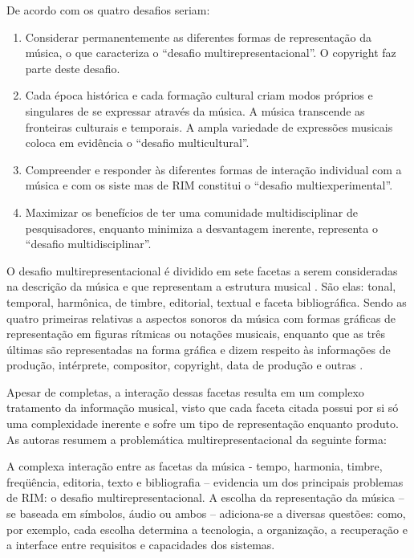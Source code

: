 De acordo com  os quatro desafios seriam:

\begin{citacao}
    \begin{enumerate}
        \item Considerar permanentemente as diferentes formas de representação da música, o que caracteriza o “desafio multirepresentacional”. O copyright faz parte deste desafio.
        \item Cada época histórica e cada formação cultural criam modos próprios e singulares de se expressar através da música. A música transcende as fronteiras culturais e temporais. A ampla variedade de expressões musicais coloca em evidência o “desafio multicultural”.
        \item Compreender e responder às diferentes formas de interação individual com a música e com os siste mas de RIM constitui o “desafio multiexperimental”.
        \item Maximizar os benefícios de ter uma comunidade multidisciplinar de pesquisadores, enquanto minimiza a desvantagem inerente, representa o “desafio multidisciplinar”.
    \end{enumerate}
\end{citacao}

O desafio multirepresentacional é dividido em sete facetas a serem consideradas na descrição da música e que representam a estrutura musical \cite{downie2003}. São elas: tonal, temporal, harmônica, de timbre, editorial, textual e faceta bibliográfica. Sendo as quatro primeiras relativas a aspectos sonoros da música com formas gráficas de representação em figuras rítmicas ou notações musicais, enquanto que as três últimas são representadas na forma gráfica e dizem respeito às informações de produção, intérprete, compositor, copyright, data de produção e outras \cite{barros2012}.

Apesar de completas, a interação dessas facetas resulta em um complexo tratamento da informação musical, visto que cada faceta citada possui por si só uma complexidade inerente e sofre um tipo de representação enquanto produto. As autoras  resumem a problemática multirepresentacional da seguinte forma:

\begin{citacao}
    A complexa interação entre as facetas da música - tempo, harmonia, timbre, freqüência, editoria, texto e bibliografia – evidencia um dos principais problemas de RIM: o desafio multirepresentacional. A escolha da representação da música – se baseada em símbolos, áudio ou ambos – adiciona-se a diversas questões: como, por exemplo, cada escolha determina a tecnologia, a organização, a recuperação e a interface entre requisitos e capacidades dos sistemas.
\end{citacao}

